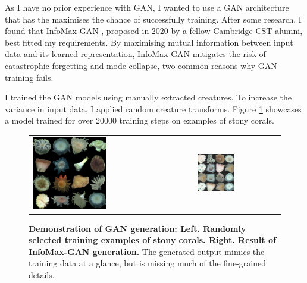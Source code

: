 \documentclass[12pt,a4paper,twoside,openany]{report}
\begin{document}
As I have no prior experience with GAN, I wanted to use a GAN architecture that has the maximises the chance of successfully training. After some research, I found that InfoMax-GAN \cite{lee_infomax-gan_2020}, proposed in 2020 by a fellow Cambridge CST alumni, best fitted my requirements. By maximising mutual information between input data and its learned representation, InfoMax-GAN mitigates the risk of catastrophic forgetting and mode collapse, two common reasons why GAN training fails.


I trained the GAN models using manually extracted creatures. To increase the variance in input data, I applied random creature transforms. Figure \ref{Fig:gan_gallary} showcases a model trained for over 20000 training steps on examples of stony corals.

\begin{figure}[H]
\begin{tabular}{ll}
\includegraphics[width=0.47\textwidth]{figs/implementation/gan/actual.jpg} &
\includegraphics[width=0.47\textwidth]{figs/implementation/gan/generated.png}
\end{tabular}
\caption{\textbf{Demonstration of GAN generation: Left. Randomly selected training examples of stony corals. Right. Result of InfoMax-GAN generation.} The generated output mimics the training data at a glance, but is missing much of the fine-grained details. }
\label{Fig:gan_gallary}
\end{figure}
\end{document}
